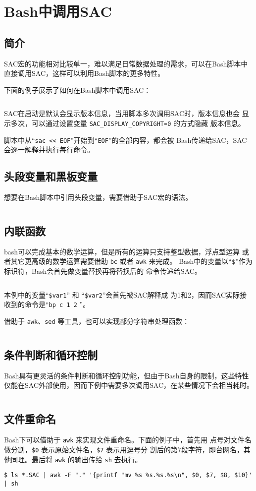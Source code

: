\section{Bash中调用SAC}
\label{sec:sac-bash}

\subsection{简介}
SAC宏的功能相对比较单一，难以满足日常数据处理的需求，可以在Bash脚本中
直接调用SAC，这样可以利用Bash脚本的更多特性。

下面的例子展示了如何在Bash脚本中调用SAC：
\inputminted{bash}{./call-in-script/simple-script.sh}

SAC在启动是默认会显示版本信息，当用脚本多次调用SAC时，版本信息也会
显示多次，可以通过设置变量 \verb|SAC_DISPLAY_COPYRIGHT=0| 的方式隐藏
版本信息。

脚本中从``\texttt{sac << EOF}''开始到``\texttt{EOF}''的全部内容，都会被
Bash传递给SAC，SAC会逐一解释并执行每行命令。

\subsection{头段变量和黑板变量}
想要在Bash脚本中引用头段变量，需要借助于SAC宏的语法。
\inputminted{bash}{./call-in-script/variables.sh}

\subsection{内联函数}
bash可以完成基本的数学运算，但是所有的运算只支持整型数据，浮点型运算
或者其它更高级的数学运算需要借助 \texttt{bc} 或者 \texttt{awk} 来完成。
Bash中的变量以``\verb|$|''作为标识符，Bash会首先做变量替换再将替换后的
命令传递给SAC。
\inputminted{bash}{./call-in-script/arithmetic-functions.sh}

本例中的变量``\verb|$var1|'' 和 ``\verb|$var2|''会首先被SAC解释成
为1和2，因而SAC实际接收到的命令是``\texttt{bp c 1 2} ''。

借助于 \texttt{awk}、\texttt{sed} 等工具，也可以实现部分字符串处理函数：
\inputminted{bash}{./call-in-script/string-functions.sh}

\subsection{条件判断和循环控制}
Bash具有更灵活的条件判断和循环控制功能，但由于Bash自身的限制，这些特性
仅能在SAC外部使用，因而下例中需要多次调用SAC，在某些情况下会相当耗时。
\inputminted{bash}{./call-in-script/do-loops.sh}

\subsection{文件重命名}
\label{subsec:rename-in-bash}
Bash下可以借助于 \texttt{awk} 来实现文件重命名。下面的例子中，首先用
点号对文件名做分割，\verb|$0| 表示原始文件名，\verb|$7| 表示用逗号分
割后的第7段字符，即台网名，其他同理。最后将 \texttt{awk} 的输出传给
\texttt{sh} 去执行。
\begin{verbatim}
$ ls *.SAC | awk -F "." '{printf "mv %s %s.%s.%s\n", $0, $7, $8, $10}' | sh
\end{verbatim}
